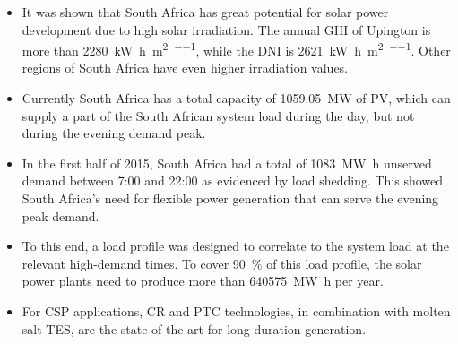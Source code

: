 \begin{itemize}
\item It was shown that South Africa has great potential for solar power development due to high solar irradiation. The annual GHI of Upington is more than \SI{2280}{\kilo\watt\hour\per\square\metre\per\year}, while the DNI is \SI{2621}{\kilo\watt\hour\per\square\metre\per\year}. Other regions of South Africa have even higher irradiation values.
\item Currently South Africa has a total capacity of \SI{1059.05}{\mega\watt} of PV, which can supply a part of the South African system load during the day, but not during the evening demand peak.

\item In the first half of 2015, South Africa had a total of \SI{1083}{\mega\watt\hour} unserved demand between 7:00 and 22:00 as evidenced by load shedding. This showed South Africa's need for flexible power generation that can serve the evening peak demand. 


\item To this end, a load profile was designed to correlate to the system load at the relevant high-demand times. To cover \SI{90}{\percent} of this load profile, the solar power plants need to produce more than \SI{640575}{\mega\watt\hour} per year.


\item For CSP applications, CR and PTC technologies, in combination with molten salt TES, are the state of the art for long duration generation.



\end{itemize}
